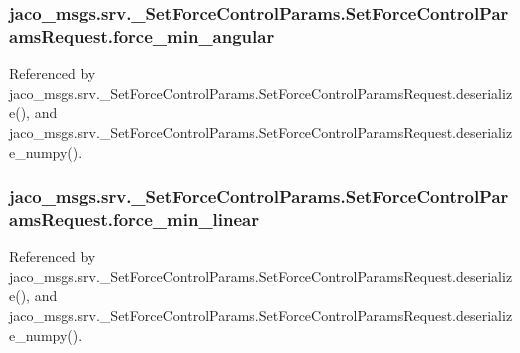 \subsubsection[{\texorpdfstring{force\+\_\+min\+\_\+angular}{force_min_angular}}]{\setlength{\rightskip}{0pt plus 5cm}jaco\+\_\+msgs.\+srv.\+\_\+\+Set\+Force\+Control\+Params.\+Set\+Force\+Control\+Params\+Request.\+force\+\_\+min\+\_\+angular}\hypertarget{classjaco__msgs_1_1srv_1_1__SetForceControlParams_1_1SetForceControlParamsRequest_a059ff47ab34fd7730218c1a609bbb956}{}\label{classjaco__msgs_1_1srv_1_1__SetForceControlParams_1_1SetForceControlParamsRequest_a059ff47ab34fd7730218c1a609bbb956}


Referenced by jaco\+\_\+msgs.\+srv.\+\_\+\+Set\+Force\+Control\+Params.\+Set\+Force\+Control\+Params\+Request.\+deserialize(), and jaco\+\_\+msgs.\+srv.\+\_\+\+Set\+Force\+Control\+Params.\+Set\+Force\+Control\+Params\+Request.\+deserialize\+\_\+numpy().

\subsubsection[{\texorpdfstring{force\+\_\+min\+\_\+linear}{force_min_linear}}]{\setlength{\rightskip}{0pt plus 5cm}jaco\+\_\+msgs.\+srv.\+\_\+\+Set\+Force\+Control\+Params.\+Set\+Force\+Control\+Params\+Request.\+force\+\_\+min\+\_\+linear}\hypertarget{classjaco__msgs_1_1srv_1_1__SetForceControlParams_1_1SetForceControlParamsRequest_a8cfd79fa02dd2f62d84811d5f04693b1}{}\label{classjaco__msgs_1_1srv_1_1__SetForceControlParams_1_1SetForceControlParamsRequest_a8cfd79fa02dd2f62d84811d5f04693b1}


Referenced by jaco\+\_\+msgs.\+srv.\+\_\+\+Set\+Force\+Control\+Params.\+Set\+Force\+Control\+Params\+Request.\+deserialize(), and jaco\+\_\+msgs.\+srv.\+\_\+\+Set\+Force\+Control\+Params.\+Set\+Force\+Control\+Params\+Request.\+deserialize\+\_\+numpy().

